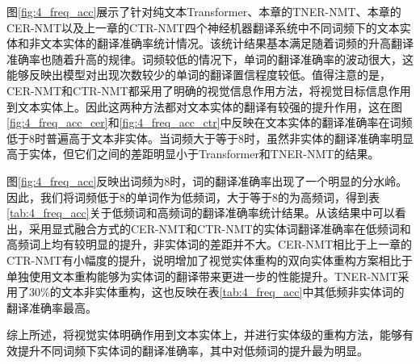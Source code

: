 图\ref{fig:4_freq_acc}展示了针对纯文本Transformer、本章的TNER-NMT、本章的CER-NMT以及上一章的CTR-NMT四个神经机器翻译系统中不同词频下的文本实体和非文本实体的翻译准确率统计情况。该统计结果基本满足随着词频的升高翻译准确率也随着升高的规律。词频较低的情况下，单词的翻译准确率的波动很大，这能够反映出模型对出现次数较少的单词的翻译置信程度较低。值得注意的是，CER-NMT和CTR-NMT都采用了明确的视觉信息作用方法，将视觉目标信息作用到文本实体上。因此这两种方法都对文本实体的翻译有较强的提升作用，这在图\ref{fig:4_freq_acc_cer}和\ref{fig:4_freq_acc_ctr}中反映在文本实体的翻译准确率在词频低于8时普遍高于文本非实体。当词频大于等于8时，虽然非实体的翻译准确率明显高于实体，但它们之间的差距明显小于Transformer和TNER-NMT的结果。


图\ref{fig:4_freq_acc}反映出词频为8时，词的翻译准确率出现了一个明显的分水岭。因此，我们将词频低于8的单词作为低频词，大于等于8的为高频词，得到表\ref{tab:4_freq_acc}关于低频词和高频词的翻译准确率统计结果。从该结果中可以看出，采用显式融合方式的CER-NMT和CTR-NMT的实体词翻译准确率在低频词和高频词上均有较明显的提升，非实体词的差距并不大。CER-NMT相比于上一章的CTR-NMT有小幅度的提升，说明增加了视觉实体重构的双向实体重构方案相比于单独使用文本重构能够为实体词的翻译带来更进一步的性能提升。TNER-NMT采用了30\%的文本非实体重构，这也反映在表\ref{tab:4_freq_acc}中其低频非实体词的翻译准确率最高。

综上所述，将视觉实体明确作用到文本实体上，并进行实体级的重构方法，能够有效提升不同词频下实体词的翻译准确率，其中对低频词的提升最为明显。